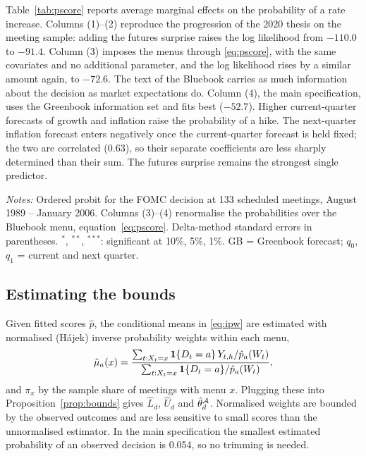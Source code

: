 Table~\ref{tab:pscore} reports average marginal effects on the probability of a rate increase. Columns (1)--(2)
reproduce the progression of the 2020 thesis on the meeting sample: adding the futures surprise raises the log
likelihood from $-110.0$ to $-91.4$. Column (3) imposes the menus through \eqref{eq:pscore}, with the same covariates
and no additional parameter, and the log likelihood rises by a similar amount again, to $-72.6$. The text of the
Bluebook carries as much information about the decision as market expectations do. Column (4), the main
specification, uses the Greenbook information set and fits best ($-52.7$). Higher current-quarter forecasts of
growth and inflation raise the probability of a hike. The next-quarter inflation forecast enters negatively once the
current-quarter forecast is held fixed; the two are correlated (0.63), so their separate coefficients are less
sharply determined than their sum. The futures surprise remains the strongest single predictor.

\begin{table}[!htbp]
  \centering
  \caption{Propensity-score models: average marginal effects on $\Prob(D_t=1)$}\label{tab:pscore}
  \small
  \par\medskip
  \begin{minipage}{0.92\linewidth}\footnotesize
  \emph{Notes:} Ordered probit for the FOMC decision at 133 scheduled meetings, August 1989 -- January 2006.
  Columns (3)--(4) renormalise the probabilities over the Bluebook menu, equation~\eqref{eq:pscore}. Delta-method
  standard errors in parentheses. $^{*}$, $^{**}$, $^{***}$: significant at 10\%, 5\%, 1\%.
  GB = Greenbook forecast; $q_0$, $q_1$ = current and next quarter.
  \end{minipage}
\end{table}

\subsection{Estimating the bounds}

Given fitted scores $\hat p$, the conditional means in \eqref{eq:ipw} are estimated with normalised (H\'ajek)
inverse probability weights within each menu,
\[
\hat\mu_a(x)=\frac{\sum_{t:X_t=x}\mathbf{1}\{D_t=a\}\,Y_{t,h}/\hat p_a(W_t)}{\sum_{t:X_t=x}\mathbf{1}\{D_t=a\}/\hat p_a(W_t)},
\]
and $\pi_x$ by the sample share of meetings with menu $x$. Plugging these into Proposition~\ref{prop:bounds} gives
$\hat L_d$, $\hat U_d$ and $\hat\theta_d^{\mathcal{A}}$. Normalised weights are bounded by the observed outcomes and are
less sensitive to small scores than the unnormalised estimator. In the main specification the smallest estimated
probability of an observed decision is 0.054, so no trimming is needed.

